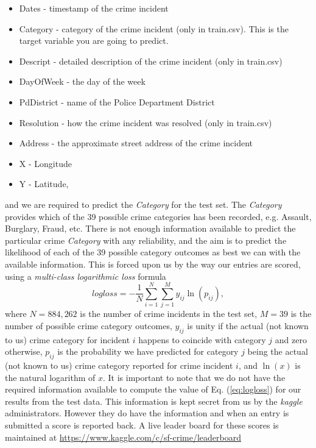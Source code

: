 \documentclass[12pt,notitlepage]{article}
\begin{document}
\begin{itemize}
\item Dates - timestamp of the crime incident
\item Category - category of the crime incident (only in train.csv). This is the target variable you are going to predict.
\item Descript - detailed description of the crime incident (only in train.csv)
\item DayOfWeek - the day of the week
\item PdDistrict - name of the Police Department District
\item Resolution - how the crime incident was resolved (only in train.csv)
\item Address - the approximate street address of the crime incident 
\item X - Longitude
\item Y - Latitude,
\end{itemize}
%
and we are required to predict the \emph{Category} for the test set. The \emph{Category} provides which of the 39 possible crime categories has been recorded, e.g. Assault, Burglary, Fraud, etc.  There is not enough information available to predict the particular crime \emph{Category} with any reliability, and the aim is to predict the likelihood of each of the 39 possible category outcomes as best we can with the available information. This is forced upon us by the way our entries are scored, using a \emph{multi-class logarithmic loss} formula
%
\begin{equation}
logloss = -\frac{1}{N}\sum_{i=1}^N \sum_{j=1}^M y_{ij} \ln(p_{ij}),\label{eq:logloss}
\end{equation}
%
where $N=884,262$ is the number of crime incidents in the test set, $M=39$ is the number of possible crime category outcomes, $y_{ij}$ is unity if the 
actual (not known to us) crime category for incident $i$ happens to coincide with category $j$ and zero otherwise, $p_{ij}$ is the probability we have 
predicted for category $j$ being the actual (not known to us) crime category reported for crime incident $i$, and $\ln(x)$ is the natural logarithm of $x$. It is important to note that we do not have the required information available to compute the value of Eq. (\ref{eq:logloss}) for our results from the test data. This information is kept secret from us by the \emph{kaggle} administrators. However they do have the information and when an entry is submitted a score is reported back. A live leader board for these scores is maintained at \url{https://www.kaggle.com/c/sf-crime/leaderboard}
\end{document}
